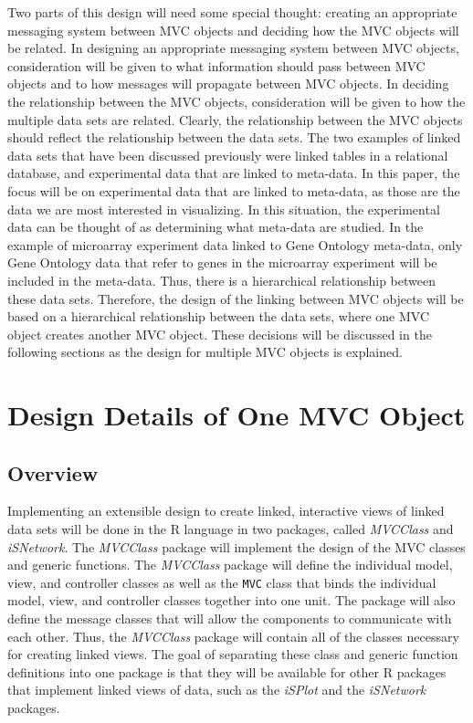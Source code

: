 \documentclass{article}[11pt]
\newcommand{\Robject}[1]{{\texttt{#1}}}
\newcommand{\Rpackage}[1]{{\textit{#1}}}
\begin{document}
Two parts of this design will need some special thought: creating an
appropriate messaging system between MVC objects and deciding how the MVC
objects will be related.  In designing an appropriate messaging system between
MVC objects, consideration will be given to what information should pass
between MVC objects and to how messages will propagate between MVC objects.
In deciding the relationship between the MVC objects, consideration will be
given to how the multiple data sets are related.  Clearly, the relationship
between the MVC objects should reflect the relationship between the data
sets.  The two examples of linked data sets that have been discussed
previously were linked tables in a relational database, and experimental data
that are linked to meta-data.  In this paper, the focus will be on experimental
data that are linked to meta-data, as those are the data we are most
interested in visualizing.  In this situation, the experimental data can be
thought of as determining what meta-data are studied.  In the example of
microarray experiment data linked to Gene Ontology meta-data, only Gene
Ontology data that refer to genes in the microarray experiment will be
included in the meta-data.  Thus, there is a hierarchical relationship between
these data sets.  Therefore, the design of the linking between MVC objects
will be based on a hierarchical relationship between the data sets, where one
MVC object creates another MVC object.  These decisions will be discussed in
the following sections as the design for multiple MVC objects is explained.

\section{Design Details of One MVC Object}\label{Sec:OneMVC}

\subsection{Overview}\label{SSec:OneOver}

Implementing an extensible design to create linked, interactive views of
linked data sets will be done in the R language in two packages, called
\Rpackage{MVCClass} and \Rpackage{iSNetwork}.  The \Rpackage{MVCClass} package
will implement the design of the MVC classes and generic functions.  The
\Rpackage{MVCClass} package will define the individual model, view, and
controller classes as well as the \Robject{MVC} class that binds the
individual model, view, and controller classes together into one unit.  The
package will also define the message classes that will allow the components to
communicate with each other.  Thus, the \Rpackage{MVCClass} package will
contain all of the classes necessary for creating linked views.   The goal of
separating these class and generic function definitions into one package is
that they will be available for other R packages that implement linked views
of data, such as the \Rpackage{iSPlot} and the \Rpackage{iSNetwork} packages.  
\end{document}
